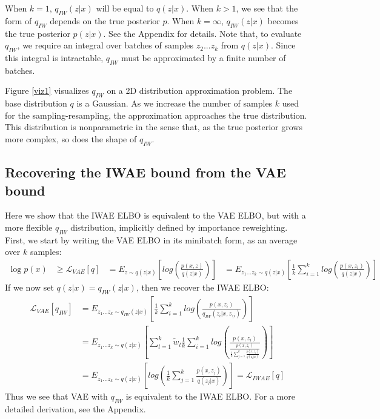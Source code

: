 \documentclass{article} %
\begin{document}
 
When $k=1$, $q_{IW}(z|x)$ will be equal to $q(z|x)$.
When $k > 1$, we see that the form of $q_{IW}$ depends on the true posterior $p$. 
When $k=\infty$, $q_{IW}(z|x)$ becomes the true posterior $p(z|x)$.
See the Appendix for details.
Note that, to evaluate $q_{IW}$, we require an integral over batches of samples $z_{2}...z_{k}$ from $q(z|x)$. Since this integral is intractable, $q_{IW}$ must be approximated by a finite number of batches.

Figure \ref{viz1} visualizes $q_{IW}$ on a 2D distribution approximation problem. The base distribution $q$ is a Gaussian.  As we increase the number of samples $k$ used for the sampling-resampling, the approximation approaches the true distribution. This distribution is nonparametric in the sense that, as the true posterior grows more complex, so does the shape of $q_{IW}$.


\subsection{Recovering the IWAE bound from the VAE bound}

Here we show that the IWAE ELBO is equivalent to the VAE ELBO, but with a more flexible $q_{IW}$ distribution, implicitly defined by importance reweighting.
First, we start by writing the VAE ELBO in its minibatch form, as an average over $k$ samples:
\begin{align} 
    \log p(x) &\geq 
    \mathcal{L}_{VAE}[q] &=
    E_{z \sim q(z|x)} \left[  log\left(\frac{p(x,z)}{q(z|x)} \right) \right]  
    &= E_{z_{1}...z_{k} \sim q(z|x)} \left[  \frac{1}{k}\sum_{i=1}^k log\left(\frac{p(x,z_i)}{q(z|x)} \right) \right]
\end{align}
If we now set $q(z|x) = q_{IW}(z|x)$, then we recover the IWAE ELBO:
\begin{align}
        \mathcal{L}_{VAE}[q_{IW}]
        &= E_{z_{1}...z_{k} \sim q_{IW}(z|x)} \left[  \frac{1}{k}\sum_{i=1}^k log\left(\frac{p(x,z_i)}{q_{IW}(z_i|x,z_{\setminus i})}  \right)  \right] \\
    &= E_{z_{1}...z_{k} \sim q(z|x)} \left[ \sum_{l=1}^k \tilde w_l \frac{1}{k}\sum_{i=1}^k log\left(\frac{p(x,z_i)}{\frac{p(x,z_i)}{\frac{1}{k}   \sum_{j=1}^k \frac{p(x,z_j)}{q(z_j|x)}}}  \right)  \right] \\
    &= E_{z_{1}...z_{k} \sim q(z|x)} \left[  log\left(\frac{1}{k}\sum_{j=1}^k \frac{p(x,z_j)}{q(z_j|x)}  \right)  \right] = \mathcal{L}_{IWAE}[q]
\end{align}
Thus we see that VAE with $q_{IW}$ is equivalent to the IWAE ELBO.  For a more detailed derivation, see the Appendix.
\end{document}
